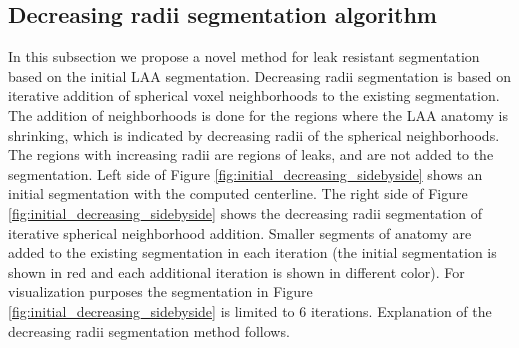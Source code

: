 \documentclass[review]{elsarticle}
\begin{document}
\subsection{Decreasing radii segmentation algorithm}
\label{sec:decreasing_radii}


In this subsection we propose a novel method for leak resistant segmentation
based on the initial LAA segmentation.  Decreasing radii segmentation is based
on iterative addition of spherical voxel neighborhoods to the existing
segmentation.  The addition of neighborhoods is done for the regions where the
LAA anatomy is shrinking, which is indicated by decreasing radii of the
spherical neighborhoods. The regions with increasing radii are regions of
leaks, and are not added to the segmentation.  Left side of Figure
\ref{fig:initial_decreasing_sidebyside} shows an initial segmentation with the
computed centerline. The right side of Figure
\ref{fig:initial_decreasing_sidebyside} shows the decreasing radii segmentation
of iterative spherical neighborhood addition. Smaller segments of anatomy are
added to the existing segmentation in each iteration (the initial segmentation
is shown in red and each additional iteration is shown in different color). For
visualization purposes the segmentation in Figure
\ref{fig:initial_decreasing_sidebyside} is limited to 6 iterations. Explanation
of the decreasing radii segmentation method follows.
\end{document}

